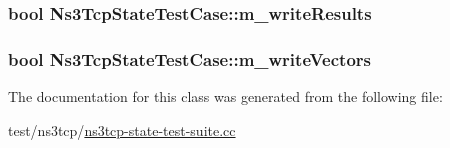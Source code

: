 \subsubsection[{\texorpdfstring{m\+\_\+write\+Results}{m_writeResults}}]{\setlength{\rightskip}{0pt plus 5cm}bool Ns3\+Tcp\+State\+Test\+Case\+::m\+\_\+write\+Results\hspace{0.3cm}{\ttfamily [private]}}\hypertarget{classNs3TcpStateTestCase_aebae71fa01360a4e38a656828d5bd466}{}\label{classNs3TcpStateTestCase_aebae71fa01360a4e38a656828d5bd466}
\subsubsection[{\texorpdfstring{m\+\_\+write\+Vectors}{m_writeVectors}}]{\setlength{\rightskip}{0pt plus 5cm}bool Ns3\+Tcp\+State\+Test\+Case\+::m\+\_\+write\+Vectors\hspace{0.3cm}{\ttfamily [private]}}\hypertarget{classNs3TcpStateTestCase_a0d2e59069324c4c41e805c543a8f1255}{}\label{classNs3TcpStateTestCase_a0d2e59069324c4c41e805c543a8f1255}


The documentation for this class was generated from the following file\+:\begin{DoxyCompactItemize}
\item 
test/ns3tcp/\hyperlink{ns3tcp-state-test-suite_8cc}{ns3tcp-\/state-\/test-\/suite.\+cc}\end{DoxyCompactItemize}
